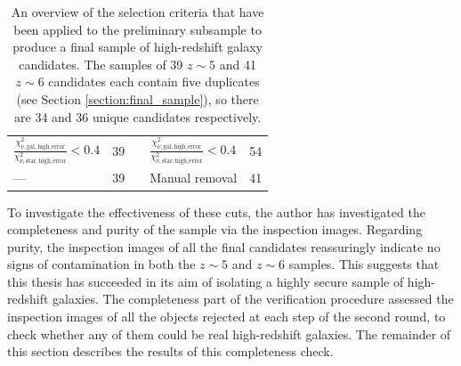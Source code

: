 {\begin{table}[p]
\begin{ThreePartTable}
\begin{tabular}{lcclc}

$\frac{\chi^2_{\nu,\mathrm{gal,high\_error}}}{\chi^2_{\nu,\mathrm{star,high\_error}}}< 0.4$ & 39 & & $\frac{\chi^2_{\nu,\mathrm{gal,high\_error}}}{\chi^2_{\nu,\mathrm{star,high\_error}}}< 0.4$ & 54 \vspace{0.4em} \\



--- & 39 & & Manual removal & 41 \vspace{0.4em}\\ 


\bottomrule
\end{tabular}
\vspace{1em}
\caption[Selection criteria for the second round of cuts]{An overview of the selection criteria that have been applied to the preliminary subsample to produce a final sample of high-redshift galaxy candidates. The samples of 39 $z\sim5$ and 41 $z\sim6$ candidates each contain five duplicates (see Section \ref{section:final_sample}), so there are 34 and 36 unique candidates respectively.}\label{table:final_cuts}
\end{ThreePartTable}
\end{table}
\clearpage
}





To investigate the effectiveness of these cuts, the author has investigated the completeness and purity of the sample via the inspection images. Regarding purity, the inspection images of all the final candidates reassuringly indicate no signs of contamination in both the $z\sim5$ and $z\sim6$ samples. This suggests that this thesis has succeeded in its aim of isolating a highly secure sample of high-redshift galaxies. The completeness part of the verification procedure assessed the inspection images of all the objects rejected at each step of the second round, to check whether any of them could be real high-redshift galaxies. The remainder of this section describes the results of this completeness check.  \par


